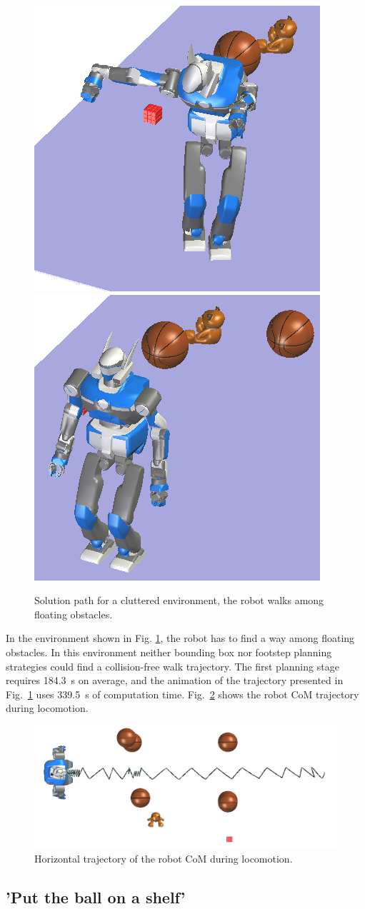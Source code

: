 \documentclass{article}
\begin{document}
\begin{figure}[h!]
\includegraphics[width=0.24\linewidth]{pics/objects-cloud/perspective-7.png}
\includegraphics[width=0.24\linewidth]{pics/objects-cloud/perspective-8.png}

\caption{Solution path for a cluttered environment, the robot walks
  among floating obstacles.}
\label{fig:cluttered}
\end{figure}

In the environment shown in Fig. \ref{fig:cluttered}, the robot
has to find a way among floating obstacles. In this
environment neither bounding box nor footstep planning strategies
could find a collision-free walk trajectory.
The first planning stage requires
184.3~s on average, and the animation of the trajectory presented in 
Fig.~\ref{fig:cluttered} uses 339.5~s of computation time. Fig.~\ref{fig:cluttered-waist} 
shows the robot CoM trajectory during locomotion.

\begin{figure}[h!]
  \centering
  \includegraphics[width=0.7\linewidth]{pics/objects-cloud/waist-trajectory.png}

  \caption{Horizontal trajectory of the robot CoM during
    locomotion.}
  \label{fig:cluttered-waist} 
\end{figure}


\subsection{'Put the ball on a shelf'}
\label{sec:shelf}
\end{document}
